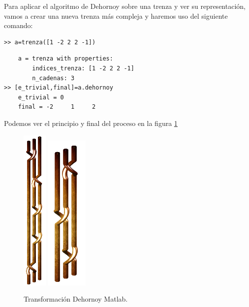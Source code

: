 \newpage
Para aplicar el algoritmo de Dehornoy sobre una trenza y ver su representación, vamos a crear una nueva trenza más compleja y haremos uso del siguiente comando:

\begin{lstlisting}
>> a=trenza([1 -2 2 2 -1])
\end{lstlisting}
\begin{lstlisting}
	a = trenza with properties:
	    indices_trenza: [1 -2 2 2 -1]
	    n_cadenas: 3
>> [e_trivial,final]=a.dehornoy
	e_trivial = 0
	final = -2     1     2
\end{lstlisting}
Podemos ver el principio y final del proceso en la figura \ref{inf2}
\begin{figure}[h!]
	\centering
	\includegraphics[width=1.2cm]{img/infor2.png}
	\includegraphics[width=2cm]{img/infor3.png}
	\caption{Transformación Dehornoy Matlab.}
	\label{inf2} 
\end{figure}

